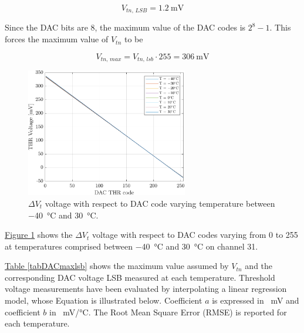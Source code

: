 \begin{equation}
    V_{\textit{tn, LSB}} = \SI{1.2}{\milli\volt}
\end{equation}

\noindent
Since the DAC bits are 8, the maximum value of the DAC codes is $2^{8}-1$. This forces the maximum value of $V_{\textit{tn}}$ to be

\begin{equation}
    V_{\textit{tn, max}} = V_{\textit{tn, lsb}} \cdot 255 = \SI{306}{\milli\volt}
\end{equation}

\begin{figure}[ht]
    \centering 
    \includegraphics[width=0.63\textwidth]{Images/chap1/results/DAC_thr/DAC_thr_voltage_TEMP.pdf}
    \caption{$\Delta V_{\textit{t}}$ voltage with respect to DAC code varying temperature between \SI{-40}{\celsius} and \SI{30}{\celsius}.}
    \label{figDACthrtemp}
\end{figure}

\noindent
\hyperref[figDACthrtemp]{Figure \ref{figDACthrtemp}} shows the $\Delta V_{\textit{t}}$ voltage with respect to DAC codes varying from 0 to 255 at temperatures comprised between \SI{-40}{\celsius} and \SI{30}{\celsius} on channel 31. 

\hyperref[tabDACmaxlsb]{Table \ref{tabDACmaxlsb}} shows the maximum value assumed by $V_{\textit{tn}}$ and the corresponding DAC voltage LSB measured at each temperature. Threshold voltage measurements have been evaluated by interpolating a linear regression model, whose Equation is illustrated below. Coefficient $a$ is expressed in \SI{}{\milli\volt} and coefficient $b$ in \SI{}{\milli\volt/\celsius}. The Root Mean Square Error (RMSE) is reported for each temperature.

